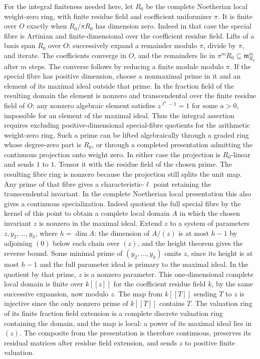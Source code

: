 \documentclass[11pt]{amsart}
\theoremstyle{definition}
\theoremstyle{remark}
\begin{document}
For the integral finiteness needed here, let $R_0$ be the complete
Noetherian local weight-zero ring, with finite residue field and
coefficient uniformizer $\pi$. It is finite over $O$ exactly when
$R_0/\pi R_0$ has dimension zero. Indeed in that case the special
fibre is Artinian and finite-dimensional over the coefficient
residue field. Lifts of a basis span $R_0$ over $O$: successively
expand a remainder modulo $\pi$, divide by $\pi$, and iterate.
The coefficients converge in $O$, and the remainders lie in
$\pi^mR_0\subseteq\mathfrak m_{R_0}^m$ after $m$ steps.
The converse follows by reducing a finite module modulo $\pi$.
If the special fibre has positive dimension, choose a nonmaximal
prime in it and an element of its maximal ideal outside that prime.
In the fraction field of the resulting domain the element is
nonzero and transcendental over the finite residue field of $O$:
any nonzero algebraic element satisfies $z^{\ell^a-1}=1$ for some
$a>0$, impossible for an element of the maximal ideal. Thus the
integral assertion requires excluding positive-dimensional
special-fibre quotients for the arithmetic weight-zero ring.
Such a prime can be lifted algebraically through a graded ring
whose degree-zero part is $R_0$, or through a completed presentation
admitting the continuous projection onto weight zero. In either
case the projection is $R_0$-linear and sends $1$ to $1$.
Tensor it with the residue field of the chosen prime. The resulting
fibre ring is nonzero because the projection still splits the unit
map. Any prime of that fibre gives a characteristic-$\ell$ point
retaining the transcendental invariant. In the complete Noetherian
local presentation this also gives a continuous specialization.
Indeed quotient the full special fibre by the kernel of this point
to obtain a complete local domain $A$ in which the chosen invariant
$z$ is nonzero in the maximal ideal. Extend $z$ to a system of
parameters $z,y_2,\ldots,y_h$, where $h=\dim A$: the dimension
of $A/(z)$ is at most $h-1$ by adjoining $(0)$ below each chain
over $(z)$, and the height theorem gives the reverse bound.
Some minimal prime of $(y_2,\ldots,y_h)$ omits $z$, since its
height is at most $h-1$ and the full parameter ideal is primary
to the maximal ideal. In the quotient by that prime, $z$ is a
nonzero parameter. This one-dimensional complete local domain
is finite over $k[[z]]$ for the coefficient residue field $k$,
by the same successive expansion, now modulo $z$.
The map from $k[[T]]$ sending $T$ to $z$ is injective since the
only nonzero prime of $k[[T]]$ contains $T$. The valuation ring
of its finite fraction field extension is a complete discrete
valuation ring containing the domain, and the map is local:
a power of its maximal ideal lies in $(z)$. The composite from
the presentation is therefore continuous, preserves its residual
matrices after residue field extension, and sends $z$ to positive
finite valuation.
\end{document}
